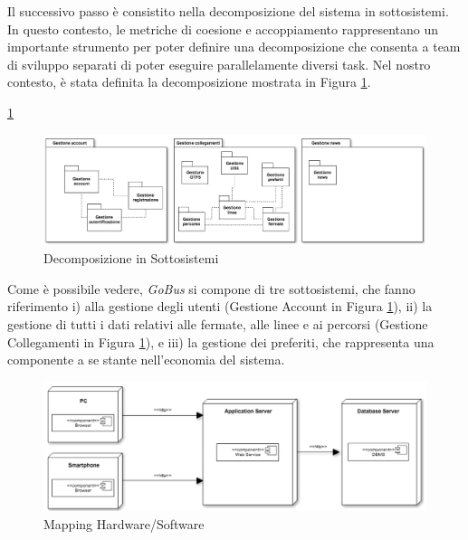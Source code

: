 Il successivo passo \`{e} consistito nella decomposizione del sistema in sottosistemi. In questo contesto, le metriche di coesione e accoppiamento rappresentano un importante strumento per poter definire una decomposizione che consenta a team di sviluppo separati di poter eseguire parallelamente diversi task. Nel nostro contesto, \`{e} stata definita la decomposizione mostrata in Figura \ref{fig:sd}.

\ref{fig:sd}
\begin{figure}[tb]
\centering
\includegraphics[scale=.4]{img/sd.png}
\caption{Decomposizione in Sottosistemi}
\label{fig:sd}
\end{figure} 

Come \`{e} possibile vedere, \emph{GoBus} si compone di tre sottosistemi, che fanno riferimento i) alla gestione degli utenti (Gestione Account in Figura \ref{fig:sd}), ii) la gestione di tutti i dati relativi alle fermate, alle linee e ai percorsi (Gestione Collegamenti in Figura \ref{fig:sd}), e iii) la gestione dei preferiti, che rappresenta una componente a se stante nell\rq economia del sistema.\\

\begin{figure}[tb]
\centering
\includegraphics[scale=.4]{img/mhs.png}
\caption{Mapping Hardware/Software}
\label{fig:mhs}
\end{figure} 

